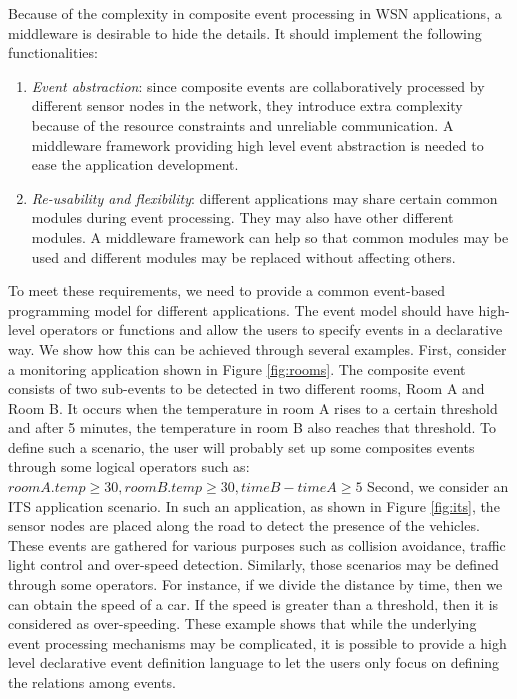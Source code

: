 Because of the complexity in composite event processing in WSN applications, a middleware is desirable to hide the details. It should implement the following functionalities:
\begin{enumerate}
\item \emph{Event abstraction}: since composite events are collaboratively processed by different sensor nodes in the network, they introduce extra complexity because of the resource constraints and unreliable communication. A middleware framework providing high level event abstraction is needed to ease the application development.
\item \emph{Re-usability and flexibility}: different applications may share certain common modules during event processing. They may also have other different modules. A middleware framework can help so that common modules may be used and different modules may be replaced without affecting others.
\end{enumerate}

To meet these requirements, we need to provide a common event-based programming model for different applications. The event model should have high-level operators or functions and allow the users to specify events in a declarative way. We show how this can be achieved through several examples. First, consider a monitoring application shown in Figure \ref{fig:rooms}. The composite event consists of two sub-events to be detected in two different rooms, Room A and Room B. It occurs when the temperature in room A rises to a certain threshold and after 5 minutes, the temperature in room B also reaches that threshold. To define such a scenario, the user will probably set up some composites events through some logical operators such as: \(roomA.temp \geq 30, roomB.temp \geq 30, timeB - timeA \geq 5\) Second, we consider an ITS application scenario. In such an application, as shown in Figure \ref{fig:its}, the sensor nodes are placed along the road to detect the presence of the vehicles. These events are gathered for various purposes such as collision avoidance, traffic light control and over-speed detection. Similarly, those scenarios may be defined through some operators. For instance, if we divide the distance by time, then we can obtain the speed of a car. If the speed is greater than a threshold, then it is considered as over-speeding. These example shows that while the underlying event processing mechanisms may be complicated, it is possible to provide a high level declarative event definition language to let the users only focus on defining the relations among events.

